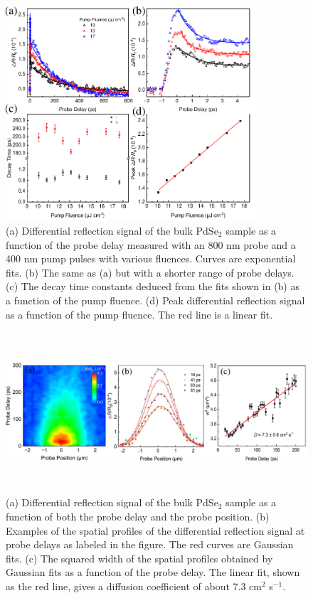 \documentclass[twoside,twocolumn,9pt]{article}
\begin{document}
\begin{figure}[h]
\centering
  \includegraphics[height=8cm]{example4}
  \caption{(a) Differential reflection signal of the bulk PdSe$_2$ sample as a function of the probe delay measured with an 800 nm probe and a 400 nm pump pulses with various fluences. Curves are exponential fits. (b) The same as (a) but with a shorter range of probe delays. (c) The decay time constants deduced from the fits shown in (b) as a function of the pump fluence. (d) Peak differential reflection signal as a function of the pump fluence. The red line is a linear fit.}
  \label{fgr:example}
\end{figure}

\begin{figure}[h]
\centering
  \includegraphics[height=6cm]{example3}
  \caption{(a) Differential reflection signal of the bulk PdSe$_2$ sample as a function of both the probe delay and the probe position. (b) Examples of the spatial profiles of the differential reflection signal at probe delays as labeled in the figure. The red curves are Gaussian fits. (c) The squared width of the spatial profiles obtained by Gaussian fits as a function of the probe delay. The linear fit, shown as the red line, gives a diffusion coefficient of about 7.3 cm$^{2}$ s$^{-1}$. }
  \label{fgr:example}
\end{figure}
\end{document}
